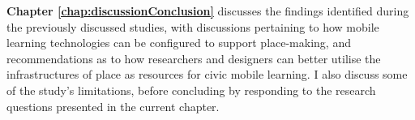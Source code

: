 \textbf{Chapter \ref{chap:discussionConclusion}} discusses the findings identified during the previously discussed studies, with discussions pertaining to how mobile learning technologies can be configured to support place-making, and recommendations as to how researchers and designers can better utilise the infrastructures of place as resources for civic mobile learning. I also discuss some of the study’s limitations, before concluding by responding to the research questions presented in the current chapter.